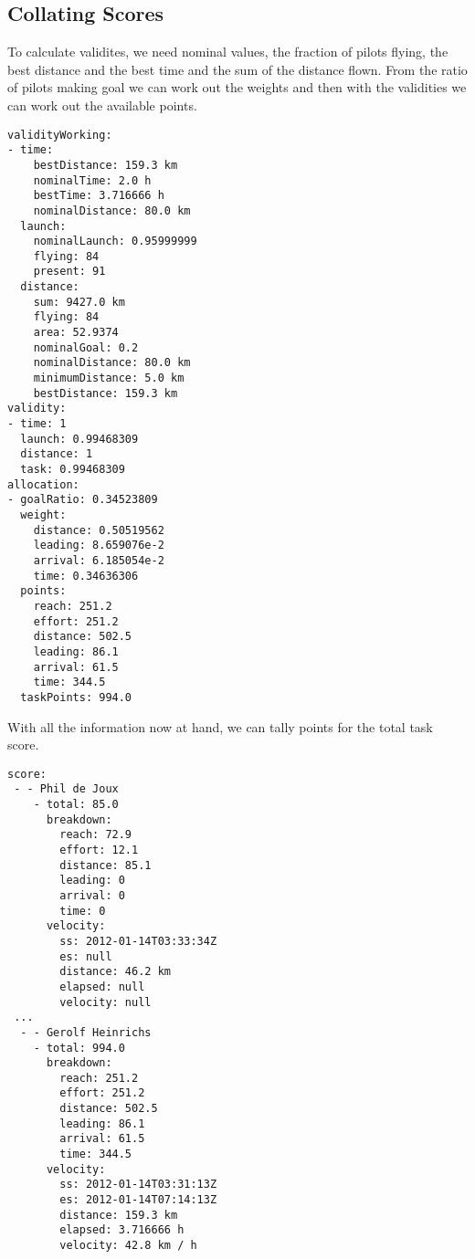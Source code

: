 \documentclass[gap.tex]{subfiles}
\begin{document}
\newpage
\subsection{Collating Scores}

To calculate validites, we need nominal values, the fraction of pilots flying,
the best distance and the best time and the sum of the distance flown. From the
ratio of pilots making goal we can work out the weights and then with the
validities we can work out the available points.

\begin{lstlisting}[caption={The validities, weights and available points for the task, \texttt{*.gap-point.yaml}}]
validityWorking:
- time:
    bestDistance: 159.3 km
    nominalTime: 2.0 h
    bestTime: 3.716666 h
    nominalDistance: 80.0 km
  launch:
    nominalLaunch: 0.95999999
    flying: 84
    present: 91
  distance:
    sum: 9427.0 km
    flying: 84
    area: 52.9374
    nominalGoal: 0.2
    nominalDistance: 80.0 km
    minimumDistance: 5.0 km
    bestDistance: 159.3 km
validity:
- time: 1
  launch: 0.99468309
  distance: 1
  task: 0.99468309
allocation:
- goalRatio: 0.34523809
  weight:
    distance: 0.50519562
    leading: 8.659076e-2
    arrival: 6.185054e-2
    time: 0.34636306
  points:
    reach: 251.2
    effort: 251.2
    distance: 502.5
    leading: 86.1
    arrival: 61.5
    time: 344.5
  taskPoints: 994.0
\end{lstlisting}

\newpage
With all the information now at hand, we can tally points for the total task
score.

\begin{lstlisting}[caption={The breakdown of the score and velocity over the task, \texttt{*.gap-point.yaml}}]
score:
 - - Phil de Joux
    - total: 85.0
      breakdown:
        reach: 72.9
        effort: 12.1
        distance: 85.1
        leading: 0
        arrival: 0
        time: 0
      velocity:
        ss: 2012-01-14T03:33:34Z
        es: null
        distance: 46.2 km
        elapsed: null
        velocity: null
 ...
  - - Gerolf Heinrichs
    - total: 994.0
      breakdown:
        reach: 251.2
        effort: 251.2
        distance: 502.5
        leading: 86.1
        arrival: 61.5
        time: 344.5
      velocity:
        ss: 2012-01-14T03:31:13Z
        es: 2012-01-14T07:14:13Z
        distance: 159.3 km
        elapsed: 3.716666 h
        velocity: 42.8 km / h
\end{lstlisting}
\end{document}
